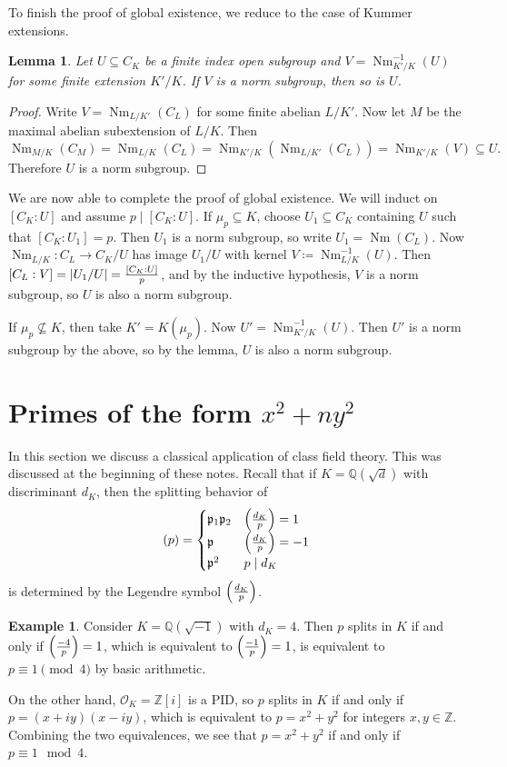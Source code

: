 \documentclass[leqno, openany]{memoir}
\newtheorem{lem}[thm]{Lemma}
\theoremstyle{definition}
\newtheorem{exm}[thm]{Example}
\theoremstyle{remark}
\theoremstyle{plain}
\theoremstyle{definition}
\theoremstyle{remark}
\newcommand{\Z}{\mathbb{Z}}
\newcommand{\Q}{\mathbb{Q}}
\newcommand{\mc}[1]{\mathcal{#1}}
\newcommand{\mf}[1]{\mathfrak{#1}}
\DeclareMathOperator{\Nm}{Nm}
\begin{document}
To finish the proof of global existence, we reduce to the case of Kummer
extensions.

\begin{lem} Let $U \subseteq C_K$ be a finite index open subgroup and $V =
\Nm_{K'/K}^{-1}(U)$ for some finite extension $K'/K$. If $V$ is a norm
subgroup, then so is $U$.  \end{lem}

\begin{proof} Write $V = \Nm_{L/K'}(C_L)$ for some finite abelian $L/K'$. Now
    let $M$ be the maximal abelian subextension of $L/K$. Then \[
    \Nm_{M/K}(C_M) = \Nm_{L/K}(C_L) = \Nm_{K'/K} (\Nm_{L/K'}(C_L)) =
\Nm_{K'/K}(V) \subseteq U. \] Therefore $U$ is a norm subgroup.  \end{proof}

We are now able to complete the proof of global existence. We will induct on
$[C_K : U]$ and assume $p \mid [C_K : U]$. If $\mu_p \subseteq K$, choose $U_1
\subseteq C_K$ containing $U$ such that $[C_K : U_1] = p$. Then $U_1$ is a norm
subgroup, so write $U_1 = \Nm(C_L)$. Now $\Nm_{L/K} \colon C_L \to C_K / U$ has
image $U_1 / U$ with kernel $V \coloneqq \Nm_{L/K}^{-1}(U)$. Then $[C_L:V] =
\abs{U_1/U} = \frac{[C_K:U]}{p}$, and by the inductive hypothesis, $V$ is a
norm subgroup, so $U$ is also a norm subgroup.

If $\mu_p \not\subseteq K$, then take $K' = K(\mu_p)$. Now $U' =
\Nm_{K'/K}^{-1}(U)$. Then $U'$ is a norm subgroup by the above, so by the
lemma, $U$ is also a norm subgroup.

\section{Primes of the form $x^2 + ny^2$}%
\label{sec:primes_of_the_form_x_2_ny_2_}

In this section we discuss a classical application of class field theory. This
was discussed at the beginning of these notes. Recall that if $K =
\Q(\sqrt{d})$ with discriminant $d_K$, then the splitting behavior of \[ (p) =
    \begin{cases} \mf{p}_1 \mf{p}_2 & \qty(\frac{d_K}{p}) = 1 \\ \mf{p} &
    \qty(\frac{d_K}{p}) = -1 \\ \mf{p}^2 & p \mid d_K \end{cases} \] is
    determined by the Legendre symbol $\qty(\frac{d_K}{p})$.

\begin{exm} Consider $K = \Q(\sqrt{-1})$ with $d_K = 4$. Then $p$ splits in $K$
    if and only if $\qty(\frac{-4}{p}) = 1$, which is equivalent to
    $\qty(\frac{-1}{p}) = 1$, is equivalent to $p \equiv 1 \pmod 4$ by basic
    arithmetic.

    On the other hand, $\mc{O}_K = \Z[i]$ is a PID, so $p$ splits in $K$ if and
only if $p = (x+iy)(x-iy)$, which is equivalent to $p = x^2 + y^2$ for integers
$x,y \in \Z$. Combining the two equivalences, we see that $p = x^2 + y^2$ if
and only if $p \equiv 1 \mod 4$.  \end{exm}
\end{document}
